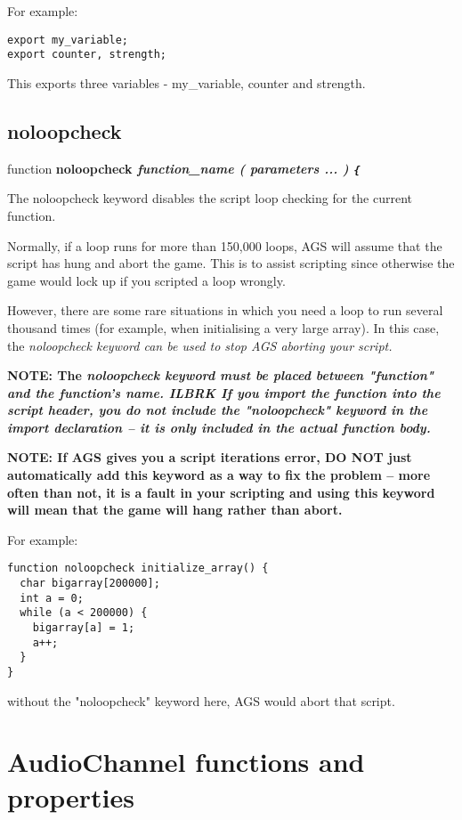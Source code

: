 For example:

\begin{verbatim}
export my_variable;
export counter, strength;
\end{verbatim}

This exports three variables - my_variable, counter and strength.


\subsection{noloopcheck}\label{noloopcheck}%

function \bf{noloopcheck} \it{function_name} ( \it{parameters ...} ) \verb${$

The noloopcheck keyword disables the script loop checking for the current function.

Normally, if a  loop runs for more than 150,000
loops, AGS will assume that the script has hung and abort the game. This is to assist
scripting since otherwise the game would lock up if you scripted a loop wrongly.

However, there are some rare situations in which you need a loop to run several thousand
times (for example, when initialising a very large array). In this case, the \it{noloopcheck}
keyword can be used to stop AGS aborting your script.

\bf{NOTE:} The \it{noloopcheck} keyword must be placed between "function" and the function's name. ILBRK
If you import the function into the script header, you \bf{do not} include the "noloopcheck" keyword
in the import declaration -- it is only included in the actual function body.

\bf{NOTE:} If AGS gives you a script iterations error, \bf{DO NOT} just automatically
add this keyword as a way to fix the problem -- more often than not, it is a fault in
your scripting and using this keyword will mean that the game will hang rather than abort.

For example:
\begin{verbatim}
function noloopcheck initialize_array() {
  char bigarray[200000];
  int a = 0;
  while (a < 200000) {
    bigarray[a] = 1;
    a++;
  }
}
\end{verbatim}
without the "noloopcheck" keyword here, AGS would abort that script.


\section{AudioChannel functions and properties}\label{AudioChannelCommands}%

